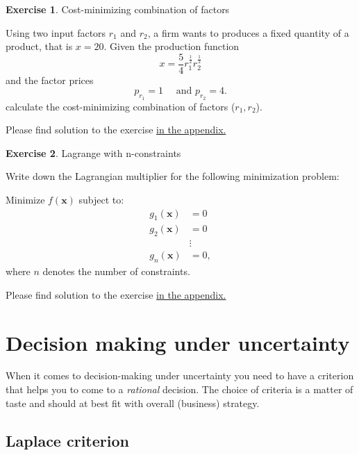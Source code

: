 \documentclass[
  12pt,
  oneside]{book}
\theoremstyle{definition}
\theoremstyle{definition}
\theoremstyle{definition}
\newtheorem{exercise}{Exercise}[chapter]
\theoremstyle{definition}
\theoremstyle{remark}
\begin{document}
\begin{exercise}
\protect\hypertarget{exr:costmin}{}\label{exr:costmin}Cost-minimizing combination of factors

Using two input factors \(r_1\) and \(r_2\), a firm wants to produces a fixed quantity of a product, that is \(x=20\). Given the production function
\[
    x=\frac{5}{4} r_1^{\frac{1}{2}} r_2^{\frac{1}{2}}
    \] and the factor prices
\[
    p_{r_1}=1 \quad \text{ and } p_{r_2}=4.
    \]
calculate the cost-minimizing combination of factors (\(r_1, r_2\)).

Please find solution to the exercise \protect\hyperlink{sol:costmin}{in the appendix.}
\end{exercise}

\begin{exercise}
\protect\hypertarget{exr:lagrcons}{}\label{exr:lagrcons}Lagrange with n-constraints

Write down the Lagrangian multiplier for the following minimization problem:

Minimize \(f(\mathbf{x})\) subject to:
\[\begin{aligned}
    g_1(\mathbf{x})&=0 \\
    g_2(\mathbf{x})&=0\\
    &\vdots\\
    g_n(\mathbf{x})&=0,\end{aligned}\]
where \(n\) denotes the number of constraints.
\end{exercise}

Please find solution to the exercise \protect\hyperlink{sol:lagrcons}{in the appendix.}

\hypertarget{decision-making-under-uncertainty}{%
\section{Decision making under uncertainty}\label{decision-making-under-uncertainty}}

When it comes to decision-making under uncertainty you need to have a criterion that helps you to come to a \emph{rational} decision. The choice of criteria is a matter of taste and should at best fit with overall (business) strategy.

\hypertarget{laplace-criterion}{%
\subsection*{Laplace criterion}\label{laplace-criterion}}
\end{document}
